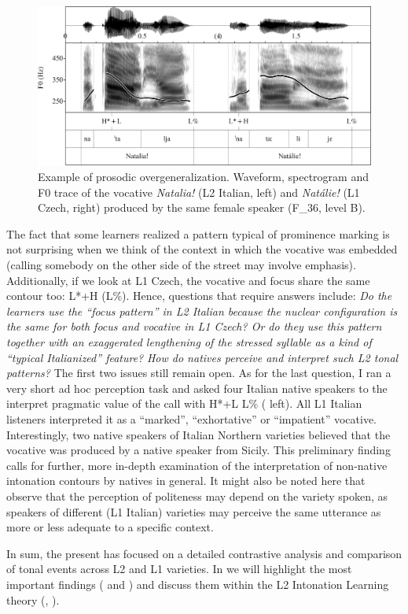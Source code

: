 \begin{figure}
\includegraphics[width=\textwidth]{figures/Figure_4.154.png}
\caption{Example of prosodic overgeneralization. Waveform, spectrogram and F0 trace of the vocative \textit{Natalia!} (L2 Italian, left) and \textit{Natálie!} (L1 Czech, right) produced by the same female speaker (\mbox{F\_36}, level B).}
\label{fig:4.154}
\end{figure}

The fact that some learners realized a pattern typical of prominence marking is not surprising when we think of the context in which the vocative was embedded (calling somebody on the other side of the street may involve emphasis). Additionally, if we look at L1 Czech, the vocative and focus share the same contour too: L*+H (L\%). Hence, questions that require answers include: \textit{Do the learners use the “focus pattern” in L2 Italian because the nuclear configuration is the same for both focus and vocative in L1 Czech? Or do they use this pattern together with an exaggerated lengthening of the stressed syllable as a kind of “typical Italianized” feature?} \textit{How do natives perceive and interpret such L2 tonal patterns?} The first two issues still remain open. As for the last question, I ran a very short ad hoc perception task and asked four Italian native speakers to the interpret pragmatic value of the call with H*+L L\% ( left). All L1 Italian listeners interpreted it as a “marked”, “exhortative” or “impatient” vocative. Interestingly, two native speakers of Italian Northern varieties believed that the vocative was produced by a native speaker from Sicily. This preliminary finding calls for further, more in-depth examination of the interpretation of non-native intonation contours by natives in general. It might also be noted here that \citet{GiliFivelaBazzanella2014} observe that the perception of politeness may depend on the variety spoken, as speakers of different (L1 Italian) varieties may perceive the same utterance as more or less adequate to a specific context.


In sum, the present  has focused on a detailed contrastive analysis and comparison of tonal events across L2 and L1 varieties. In  we will highlight the most important findings ( and ) and discuss them within the L2 Intonation Learning theory (\citealt{Mennen2015}, ).
